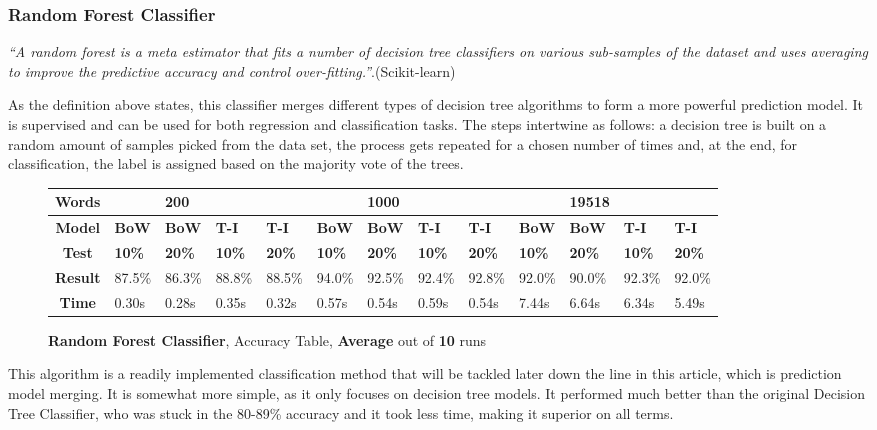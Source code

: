 \documentclass{article}
\begin{document}
	\subsubsection{Random Forest Classifier}
	\par \textit{``A random forest is a meta estimator that fits a number of decision tree classifiers on various sub-samples of the dataset and uses averaging to improve the predictive accuracy and control over-fitting.''}.(Scikit-learn)
	\par As the definition above states, this classifier merges different types of decision tree algorithms to form a more powerful prediction model. It is supervised and can be used for both regression and classification tasks. The steps intertwine as follows: a decision tree is built on a random amount of samples picked from the data set, the process gets repeated for a chosen number of times and, at the end, for classification, the label is assigned based on the majority vote of the trees.
	\begin{figure}[!h]
		\begin{tabular}{||c||l|l|l|l||l|l|l|l||l|l|l|l||}
			\hline
			\textbf{Words} &  & \textbf{200} & & & &\textbf{1000} & & & & \textbf{19518} &  & \\ \hline 
			\textbf{Model} & \textbf{BoW} & \textbf{BoW} & \textbf{T-I} & \textbf{T-I} &\textbf{BoW} & \textbf{BoW} & \textbf{T-I} & \textbf{T-I} & \textbf{BoW} & \textbf{BoW} & \textbf{T-I} & \textbf{T-I}\\ \hline
			\textbf{Test} & \textbf{10\%} & \textbf{20\%} & \textbf{10\%} & \textbf{20\%} & \textbf{10\%} & \textbf{20\%} & \textbf{10\%} & \textbf{20\%} & \textbf{10\%} & \textbf{20\%} & \textbf{10\%} & \textbf{20\%} \\ \hline \hline  
			\textbf{Result} &87.5\% & 86.3\% & 88.8\% & 88.5\% & 94.0\% & 92.5\% & 92.4\% & 92.8\% & 92.0\% & 90.0\% & 92.3\% & 92.0\% \\ \hline 
			\textbf{Time} & 0.30s & 0.28s & 0.35s & 0.32s & 0.57s & 0.54s & 0.59s & 0.54s & 7.44s & 6.64s & 6.34s & 5.49s \\ \hline 
		\end{tabular}
		\caption{\textbf{Random Forest Classifier}, Accuracy Table, \textbf{Average} out of \textbf{10} runs}
	\end{figure}
	\par This algorithm is a readily implemented classification method that will be tackled later down the line in this article, which is prediction model merging. It is somewhat more simple, as it only focuses on decision tree models. It performed much better than the original Decision Tree Classifier, who was stuck in the 80-89\% accuracy and it took less time, making it superior on all terms. 	
\end{document}
